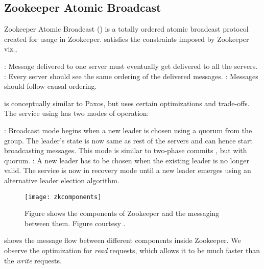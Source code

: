 \subsection{Zookeeper Atomic Broadcast}

Zookeeper Atomic Broadcast ()
\citep{Reed:2008:STO:1529974.1529978, JunqueiraRS11} is a
totally ordered atomic broadcast protocol created for usage in Zookeeper.
 satisfies the constraints imposed by Zookeeper viz.,

\begin{itemize}
    : Message delivered to one server must eventually
    get delivered to all the servers.
    : Every server should see the same ordering of the
    delivered messages.
    : Messages should follow causal%
    ordering.
\end{itemize}

 is conceptually similar to Paxos, but uses certain optimizations and
trade-offs. The service using  has two modes of operation:

\begin{itemize}
    : Broadcast mode begins when a new leader is chosen
    using a quorum from the group. The leader's state is now same as rest of
    the servers and can hence start broadcasting messages.
    This mode is similar to two-phase commits \citep{Gray78}, but with quorum.
    : A new leader has to be chosen when the existing leader
    is no longer valid. The service is now in recovery mode until a new leader
    emerges using an alternative leader election algorithm.
\end{itemize}

\begin{figure}
  \texttt{[image: zkcomponents]}
  \caption[Zookeeper Components]{%
    Figure shows the components of Zookeeper and the messaging between them.
    Figure courtesy \citet{zookeeper}.}
  \label{figure:zookeeper}
\end{figure}

 shows the message flow between different components inside
Zookeeper. We observe the optimization for \emph{read} requests, which allows it
to be much faster than the \emph{write} requests.

